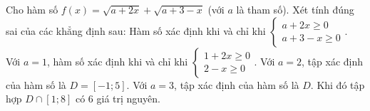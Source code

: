 \begin{ex}
Cho hàm số $f(x)=\sqrt{a+2x}+\sqrt{a+3-x}$ (với $a$ là tham số). Xét tính đúng sai của các khẳng định sau:
\choiceTF
{\True Hàm số xác định khi và chỉ khi $\begin{cases}a+2x\ge0\\ a+3-x\ge0\end{cases}$.}
{Với $a=1$, hàm số xác định khi và chỉ khi $\begin{cases}1+2x\ge0\\ 2-x\ge0\end{cases}$.}
{\True Với $a=2$, tập xác định của hàm số là $D=[-1;5]$.}
{\True Với $a=3$, tập xác định của hàm số là $D$. Khi đó tập hợp $D\cap[1;8]$ có $6$ giá trị nguyên.}
\end{ex}

